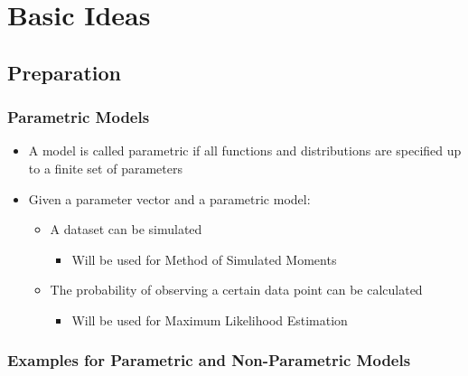 \documentclass[11pt]{beamer}
\begin{document}
\section{Basic Ideas}


\subsection{Preparation}

\begin{frame}[c]\frametitle{Parametric Models}
    \begin{itemize}
        \item A model is called parametric if all functions and distributions are specified up to a finite set of parameters
        \item Given a parameter vector and a parametric model:
        \begin{itemize}
            \item A dataset can be simulated
            \begin{itemize}
                \item Will be used for Method of Simulated Moments
            \end{itemize}
            \item The probability of observing a certain data point can be calculated
            \begin{itemize}
                \item Will be used for Maximum Likelihood Estimation
            \end{itemize}
        \end{itemize}
    \end{itemize}
\end{frame}


\begin{frame}[c]\frametitle{Examples for Parametric and Non-Parametric Models}
\end{frame}
\end{document}
